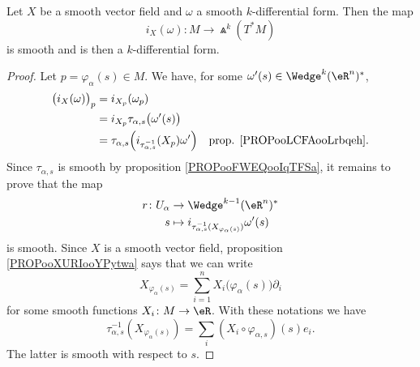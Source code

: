 \begin{propositionDef}		\label{PROPooTBFLooVCqycE}
	Let \( X\) be a smooth vector field and \( \omega\) a smooth \( k\)-differential form. Then the map
	\begin{equation}
		i_X(\omega) \colon M\to \Wedge^k(T^*M)
	\end{equation}
	is smooth and is then a \( k\)-differential form.
\end{propositionDef}

\begin{proof}
	Let \( p=\varphi_{\alpha}(s)\in M\). We have, for some \( \omega'(s)\in \Wedge^k(\eR^n)^*\),
	\begin{subequations}
		\begin{align}
			\big( i_X(\omega) \big)_p & = i_{X_p}(\omega_p)                                                                                       \\
			                          & =i_{X_p} \tau_{\alpha,s}\big( \omega'(s) \big)                                                            \\
			                          & =\tau_{\alpha,s}\Big( i_{\tau_{\alpha,s}^{-1}}(X_p)\omega' \Big) & \text{prop. \ref{PROPooLCFAooLrbqeh}.}
		\end{align}
	\end{subequations}
	Since \( \tau_{\alpha,s}\) is smooth by proposition \ref{PROPooFWEQooIqTFSa}, it remains to prove that the map
	\begin{equation}
		\begin{aligned}
			r\colon U_{\alpha} & \to \Wedge^{k-1}(\eR^n)^*                                           \\
			s                  & \mapsto i_{\tau_{\alpha,s}^{-1}(X_{\varphi_{\alpha}(s)})}\omega'(s)
		\end{aligned}
	\end{equation}
	is smooth. Since \( X\) is a smooth vector field, proposition \ref{PROPooXURIooYPytwa} says that we can write
	\begin{equation}
		X_{\varphi_{\alpha}(s)}=\sum_{i=1}^nX_i\big( \varphi_{\alpha}(s) \big)\partial_i
	\end{equation}
	for some smooth functions \(X_i \colon M\to \eR  \). With these notations we have
	\begin{equation}
		\tau_{\alpha,s}^{-1}(X_{\varphi_{\alpha}(s)})=\sum_i(X_i\circ \varphi_{\alpha,s})(s)e_i.
	\end{equation}
	The latter is smooth with respect to \( s\).
\end{proof}


